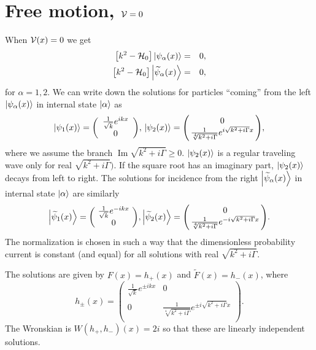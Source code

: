 \section{Free motion, ${\cal V}=0$}
%
%
When ${\cal V}(x)=0$ we get
%
\begin{eqnarray}
	\left[k^2-{\cal H}_{0}\right]\ket{\psi_{\alpha}(x)}&=&0,
	\nonumber\\
	\left[k^2-{\cal H}_{0}\right]\ket{\widetilde{\psi}_{\alpha}(x)}&=&0,
\end{eqnarray}
%
for $\alpha=1,2$.
We can write down the solutions for particles ``coming'' from the left $\ket{\psi_{\alpha}(x)}$ in  internal state $\ket{\alpha}$ as
%
\begin{eqnarray}
	\ket{\psi_{1}(x)} = \left(\begin{array}{c}
	\frac{1}{\sqrt{k}} e^{i k x}\\
	0
	\end{array}\right)\!,
	\,
	\ket{\psi_{2}(x)} = \left(\!\!\begin{array}{c}
	0\\
	\frac{1}{\sqrt[4]{k^2+i \Gamma}} e^{i \sqrt{k^2+i \Gamma}x}
	\end{array}\!\!\right)\!,
	\nonumber
\end{eqnarray}
%
where we assume the branch $\operatorname{Im} \sqrt{k^2+i \Gamma}\ge 0$.
$\ket{\psi_2(x)}$ is a regular traveling wave only for real $\sqrt{k^2+i\Gamma})$. If the square root has an imaginary part,  $\ket{\psi_2(x)}$  decays  from left to right.
%
The solutions for incidence from the right  $\ket{\widetilde{\psi}_{\alpha}(x)}$ in internal state $\ket{\alpha}$ are similarly
%
\begin{eqnarray}
	\ket{\widetilde{\psi}_{1}(x)} = \left(\!\begin{array}{c}
	\frac{1}{\sqrt{k}} e^{-i k x}\\
	0
	\end{array}\!\right)\!,
	\ket{\widetilde{\psi}_{2}(x)} = \left(\!\!\begin{array}{c}
	0\\
	\frac{1}{\sqrt[4]{k^2+i \Gamma}} e^{-i \sqrt{k^2+i \Gamma}x}
	\end{array}\!\!\right)\!.
	\nonumber
\end{eqnarray}
%
The normalization is chosen in such a way that the dimensionless probability current
is constant (and equal) for all solutions with real $\sqrt{k^2+i\Gamma}$.


The solutions are given by $F(x) = h_+ (x)$ and $\widetilde F (x) = h_- (x)$, where
%
\begin{equation}
	h_{\pm}(x)=\left(\begin{array}{cc}
	\frac{1}{\sqrt{k}}e^{\pm i k x} & 0\\
	0 & \frac{1}{\sqrt[4]{k^2+i \Gamma}} e^{\pm i \sqrt{k^2+i \Gamma} x} \\
	\end{array}\right).
\end{equation}
%
The Wronskian is $W(h_{+},h_{-})(x)=2i$ so that these are linearly independent solutions.


